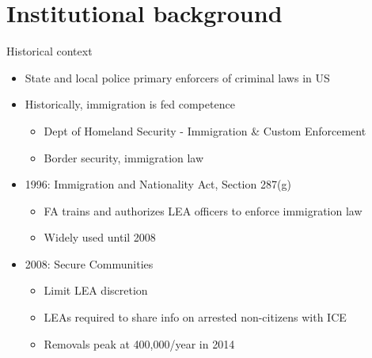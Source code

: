 \documentclass[xcolor=pdftex,dvipsnames,table,handout]{beamer}
\begin{document}
\section{Institutional background}
\begin{frame}[label = history]{Historical context}
\pause
\begin{itemize}
\item State and local police primary enforcers of criminal laws in US\vspace{0.20cm}\pause
\item Historically, immigration is fed competence\vspace{0.10cm}
\begin{itemize}
\item Dept of Homeland Security - Immigration \& Custom Enforcement \vspace{0.10cm}
\item Border security, immigration law
\end{itemize}\vspace{0.20cm}\pause
\item 1996: Immigration and Nationality Act, Section 287(g)\vspace{0.10cm}
\begin{itemize}
\item FA trains and authorizes LEA officers to enforce immigration law\vspace{0.10cm}
\item Widely used until 2008
\end{itemize}\vspace{0.20cm}\pause
\item 2008: Secure Communities \hyperlink{sc}{}
\vspace{0.10cm}
\begin{itemize}
\item Limit LEA discretion\vspace{0.10cm}
\item LEAs required to share info on arrested non-citizens with ICE \vspace{0.10cm}
\item Removals peak at 400,000/year in 2014
\end{itemize}
\end{itemize}
\end{frame}
\end{document}
